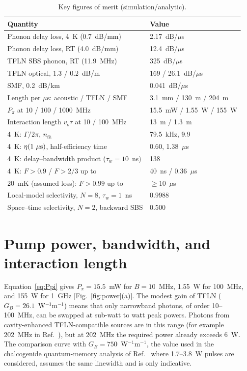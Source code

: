\documentclass[reprint,amsmath,amssymb,aps,prapplied,superscriptaddress,floatfix]{revtex4-2}
\newcommand{\dBus}{dB/$\mu$s}
\begin{document}
\begin{table}[t]
\footnotesize
\caption{Key figures of merit (simulation/analytic).}
\label{tab:fom}
\begin{ruledtabular}
\begin{tabular}{p{4.6cm}p{3.4cm}}
Quantity & Value\\ \hline
\raggedright Phonon delay loss, 4~K (0.7~dB/mm)&\raggedright 2.17~\dBus{}\tabularnewline
\raggedright Phonon delay loss, RT (4.0~dB/mm)&\raggedright 12.4~\dBus{}\tabularnewline
\raggedright TFLN SBS phonon, RT (11.9~MHz)&\raggedright 325~\dBus{}\tabularnewline
\raggedright TFLN optical, 1.3 / 0.2~dB/m&\raggedright 169 / 26.1~\dBus{}\tabularnewline
\raggedright SMF, 0.2~dB/km&\raggedright 0.041~\dBus{}\tabularnewline
\raggedright Length per $\mu$s: acoustic / TFLN / SMF&\raggedright 3.1~mm / 130~m / 204~m\tabularnewline
\raggedright $P_\pi$ at 10 / 100 / 1000~MHz&\raggedright 15.5~mW / 1.55~W / 155~W\tabularnewline
\raggedright Interaction length $v_o\tau$ at 10 / 100~MHz&\raggedright 13~m / 1.3~m\tabularnewline
\raggedright 4~K: $\Gamma/2\pi$, $n_{th}$&\raggedright 79.5~kHz, 9.9\tabularnewline
\raggedright 4~K: $\eta(1~\mu{\rm s})$, half-efficiency time&\raggedright 0.60, 1.38~$\mu$s\tabularnewline
\raggedright 4~K: delay--bandwidth product ($\tau_w=10$~ns)&\raggedright 138\tabularnewline
\raggedright 4~K: $F>0.9$ / $F>2/3$ up to&\raggedright 40~ns / 0.36~$\mu$s\tabularnewline
\raggedright 20~mK (assumed loss): $F>0.99$ up to&\raggedright $\ge$10~$\mu$s\tabularnewline
\raggedright Local-model selectivity, $N=8$, $\tau_w=1$~ns&\raggedright 0.9988\tabularnewline
\raggedright Space--time selectivity, $N=2$, backward SBS&\raggedright 0.500\tabularnewline
\end{tabular}
\end{ruledtabular}
\end{table}

\section{Pump power, bandwidth, and interaction length}\label{sec:length}
Equation~\eqref{eq:Ppi} gives $P_\pi=15.5$~mW for $B=10$~MHz, 1.55~W for 100~MHz, and 155~W for 1~GHz [Fig.~\ref{fig:power}(a)]. The modest gain of TFLN ($G_B=26.1$~W$^{-1}$m$^{-1}$) means that only narrowband photons, of order 10--100~MHz, can be swapped at sub-watt to watt peak powers. Photons from cavity-enhanced TFLN-compatible sources are in this range (for example 202~MHz in Ref.~\cite{Yang2026QFP}), but at 202~MHz the required power already exceeds 6~W. The comparison curve with $G_B=750$~W$^{-1}$m$^{-1}$, the value used in the chalcogenide quantum-memory analysis of Ref.~\cite{ZhuGenesStiller2026} where 1.7--3.8~W pulses are considered, assumes the same linewidth and is only indicative.
\end{document}
